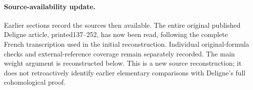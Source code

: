 \documentclass[
]{article}
\begin{document}
\clearpage
\paragraph{Source-availability update.}
Earlier sections record the sources then available. The entire original
published Deligne article, printed137--252, has now been read, following
the complete French transcription used in the initial reconstruction.
Individual original-formula checks and external-reference coverage remain
separately recorded. The main weight argument is reconstructed below.
This is a new source reconstruction; it does not retroactively identify
earlier elementary comparisons with Deligne's full cohomological proof.



\providecommand{\minf}{\mathcal M_\infty}
\clearpage

\clearpage

\clearpage

\clearpage


\clearpage

\clearpage

\clearpage

\clearpage

\clearpage



\clearpage

\clearpage

\clearpage

\clearpage




\clearpage

\clearpage

\clearpage

\clearpage

\clearpage

\clearpage

\end{document}
